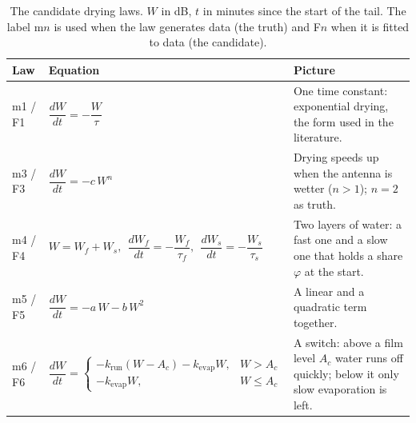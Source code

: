 \documentclass[11pt,a4paper]{article}
\begin{document}
\begin{table}[H]
\centering
\caption{The candidate drying laws. $W$ in dB, $t$ in minutes since the start of the tail. The label m$n$ is used
when the law generates data (the truth) and F$n$ when it is fitted to data (the candidate).}
\label{tab:laws}
\small
\begin{tabularx}{\linewidth}{@{}l l Y@{}}
\toprule
\textbf{Law} & \textbf{Equation} & \textbf{Picture} \\
\midrule
m1 / F1 & $\dfrac{dW}{dt} = -\dfrac{W}{\tau}$ & One time constant: exponential drying, the form used in the literature. \\[2.2ex]
m3 / F3 & $\dfrac{dW}{dt} = -c\,W^{n}$ & Drying speeds up when the antenna is wetter ($n > 1$); $n = 2$ as truth. \\[2.2ex]
m4 / F4 & $W = W_{f} + W_{s},\ \ \dfrac{dW_{f}}{dt} = -\dfrac{W_{f}}{\tau_{f}},\ \ \dfrac{dW_{s}}{dt} = -\dfrac{W_{s}}{\tau_{s}}$ & Two layers of water: a fast one and a slow one that holds a share $\varphi$ at the start. \\[2.2ex]
m5 / F5 & $\dfrac{dW}{dt} = -a\,W - b\,W^{2}$ & A linear and a quadratic term together. \\[2.2ex]
m6 / F6 & $\dfrac{dW}{dt} = \begin{cases} -k_{\mathrm{run}}(W - A_{c}) - k_{\mathrm{evap}}W, & W > A_{c} \\ -k_{\mathrm{evap}}W, & W \le A_{c} \end{cases}$ & A switch: above a film level $A_{c}$ water runs off quickly; below it only slow evaporation is left. \\
\bottomrule
\end{tabularx}
\end{table}
\end{document}
